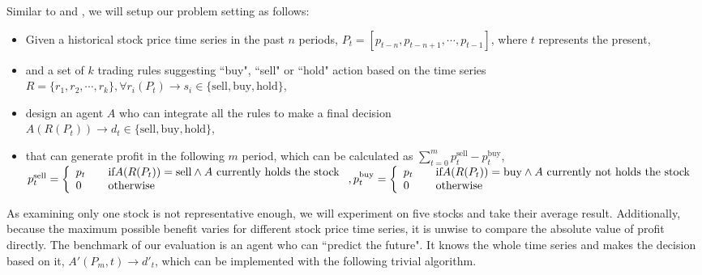 \documentclass{article}
\begin{document}
Similar to \cite{genetic-algorithms-for-predicting-the-egyptian-stock-market}
and \cite{stock-timing-using-genetic-algorithms},
we will setup our problem setting as follows:
\begin{itemize}
    \item Given a historical stock price time series in the past $n$ periods, $P_t=\left[p_{t-n}, p_{t-n+1}, \cdots, p_{t-1}\right]$,
          where $t$ represents the present,
    \item and a set of $k$ trading rules suggesting ``buy", ``sell" or ``hold" action based on the time series\\
          $R=\{r_1, r_2, \cdots, r_k\}, \forall r_i(P_t) \rightarrow s_i \in \{\text{sell}, \text{buy}, \text{hold}\}$,
    \item design an agent $A$ who can integrate all the rules to make a final decision\\
          $A(R(P_t)) \rightarrow d_t \in \{\text{sell}, \text{buy}, \text{hold}\}$,
    \item that can generate profit in the following $m$ period,
          which can be calculated as $\sum \limits_{t=0}^{m} p_{t}^{\text{sell}} - p_{t}^{\text{buy}}$,\\
          $p_{t}^{\text{sell}} = \left\{
              \begin{array}{ll}
                  p_t \quad & \text{if} A(R(P_t)) = \text{sell} \wedge A \text{ currently holds the stock} \\
                  0 \quad   & \text{otherwise}
              \end{array}\right.,\\
              p_t^{\text{buy}} = \left\{
              \begin{array}{ll}
                  p_t \quad & \text{if} A(R(P_t)) = \text{buy} \wedge A \text{ currently not holds the stock} \\
                  0 \quad   & \text{otherwise}
              \end{array}
              \right.$
\end{itemize}

As examining only one stock is not representative enough,
we will experiment on five stocks and take their average result.
Additionally, because the maximum possible benefit varies for different stock price time series,
it is unwise to compare the absolute value of profit directly.
The benchmark of our evaluation is an agent who can ``predict the future".
It knows the whole time series and makes the decision based on it,
$A'(P_m, t) \rightarrow d'_t$,
which can be implemented with the following trivial algorithm.
\end{document}
